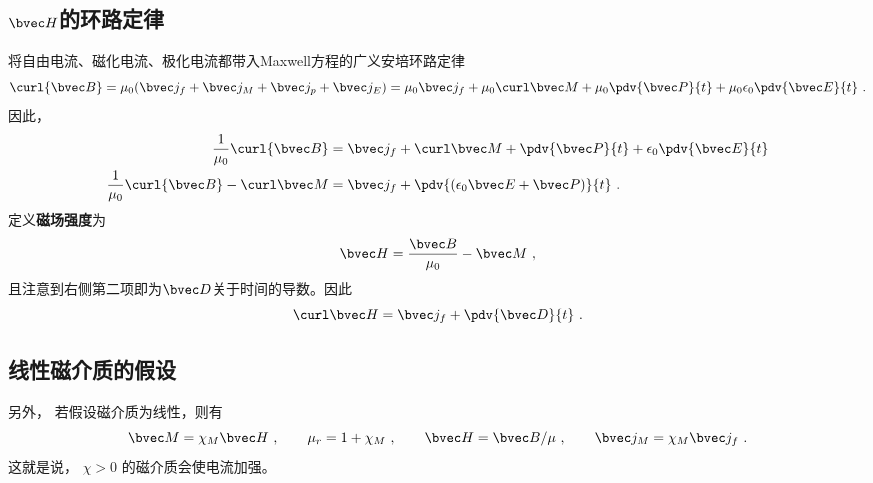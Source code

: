\subsection{$\bvec H$的环路定律}
将自由电流、磁化电流、极化电流都带入Maxwell方程的广义安培环路定律
\begin{equation}
\curl {\bvec B} = \mu_0 (\bvec j_f + \bvec j_M + \bvec j_p + \bvec j_E) = \mu_0 \bvec j_f + \mu_0 \curl \bvec M + \mu_0 \pdv{\bvec P}{t} + \mu_0 \epsilon_0 \pdv{\bvec E}{t}~.
\end{equation}
因此，
\begin{align}
\frac{1}{\mu_0}\curl {\bvec B} &= \bvec j_f + \curl \bvec M + \pdv{\bvec P}{t} + \epsilon_0 \pdv{\bvec E}{t}\\
\frac{1}{\mu_0}\curl {\bvec B} - \curl \bvec M &= \bvec j_f + \pdv{(\epsilon_0\bvec E+\bvec P)}{t}~.\\
\end{align}
定义\textbf{磁场强度}为
\begin{equation}
\bvec H = \frac{\bvec B}{\mu_0} - \bvec M~,
\end{equation}
且注意到右侧第二项即为$\bvec D$关于时间的导数。因此
\begin{equation}
\curl \bvec H = \bvec j_f + \pdv{\bvec D}{t}~.
\end{equation}

\subsection{线性磁介质的假设}
另外， 若假设磁介质为线性，则有
\begin{equation}
\bvec M = \chi_M \bvec H~,
\qquad
\mu_r = 1 + \chi_M~,
\qquad
\bvec H = \bvec B/\mu~,
\qquad
\bvec j_M = \chi_M \bvec j_f~.
\end{equation}
这就是说， $\chi > 0$ 的磁介质会使电流加强。
